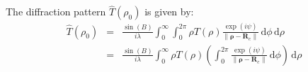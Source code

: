 \documentclass{beamer}
\begin{document}
    \begin{frame}
        The diffraction pattern $\hat{T}(\rho_{0})$ is given by:
        \begin{equation}
            \begin{array}{rcl}
                \displaystyle
                \hat{T}(\rho_{0})
                &=&
                \displaystyle
                \frac{\sin(B)}{i\lambda}
                \int_{0}^{\infty}
                    \int_{0}^{2\pi}
                        \rho{T}(\rho)
                        \frac{\exp(i\psi)}
                            {\|\boldsymbol{\rho}-\mathbf{R}_{c}\|}\,
                        \textrm{d}\phi\,\textrm{d}\rho\\[1em]
                &=&
                \displaystyle
                \frac{\sin(B)}{i\lambda}
                \int_{0}^{\infty}\rho{T}(\rho)\left(
                    \int_{0}^{2\pi}
                        \frac{\exp(i\psi)}
                            {\|\boldsymbol{\rho}-\mathbf{R}_{c}\|}\,
                        \textrm{d}\phi
                \right)\,\textrm{d}\rho
            \end{array}
        \end{equation}
    \end{frame}
\end{document}
